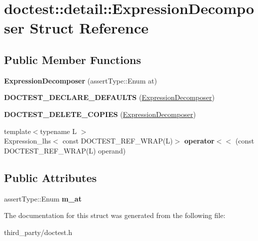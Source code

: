 \hypertarget{structdoctest_1_1detail_1_1_expression_decomposer}{}\section{doctest\+::detail\+::Expression\+Decomposer Struct Reference}
\label{structdoctest_1_1detail_1_1_expression_decomposer}
\subsection*{Public Member Functions}
\begin{DoxyCompactItemize}
\item 
\mbox{\label{structdoctest_1_1detail_1_1_expression_decomposer_a6bf2c46ebf0dc68106be801a90776e65}} 
{\bfseries Expression\+Decomposer} (assert\+Type\+::\+Enum at)
\item 
\mbox{\label{structdoctest_1_1detail_1_1_expression_decomposer_a03bbbd1cf0570b62735bfa70958621ac}} 
{\bfseries D\+O\+C\+T\+E\+S\+T\+\_\+\+D\+E\+C\+L\+A\+R\+E\+\_\+\+D\+E\+F\+A\+U\+L\+TS} (\mbox{\hyperlink{structdoctest_1_1detail_1_1_expression_decomposer}{Expression\+Decomposer}})
\item 
\mbox{\label{structdoctest_1_1detail_1_1_expression_decomposer_a42eec378b628798a6ad14e7417d74da3}} 
{\bfseries D\+O\+C\+T\+E\+S\+T\+\_\+\+D\+E\+L\+E\+T\+E\+\_\+\+C\+O\+P\+I\+ES} (\mbox{\hyperlink{structdoctest_1_1detail_1_1_expression_decomposer}{Expression\+Decomposer}})
\item 
\mbox{\label{structdoctest_1_1detail_1_1_expression_decomposer_a509102ed073422b03848d32721678080}} 
{\footnotesize template$<$typename L $>$ }\\Expression\+\_\+lhs$<$ const D\+O\+C\+T\+E\+S\+T\+\_\+\+R\+E\+F\+\_\+\+W\+R\+AP(L)$>$ {\bfseries operator$<$$<$} (const D\+O\+C\+T\+E\+S\+T\+\_\+\+R\+E\+F\+\_\+\+W\+R\+AP(L) operand)
\end{DoxyCompactItemize}
\subsection*{Public Attributes}
\begin{DoxyCompactItemize}
\item 
\mbox{\label{structdoctest_1_1detail_1_1_expression_decomposer_a1a71b19bd41d2cbd1c8b4006412870c4}} 
assert\+Type\+::\+Enum {\bfseries m\+\_\+at}
\end{DoxyCompactItemize}


The documentation for this struct was generated from the following file\+:\begin{DoxyCompactItemize}
\item 
third\+\_\+party/doctest.\+h\end{DoxyCompactItemize}
